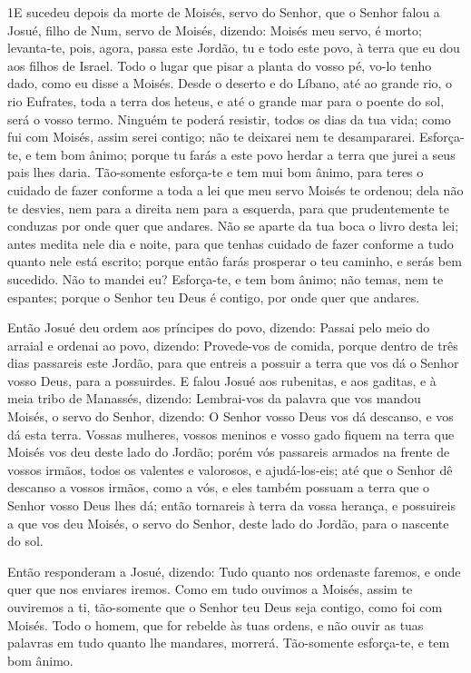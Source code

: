 
\lettrine{1} E sucedeu depois da morte de Moisés, servo do
Senhor, que o Senhor falou a Josué, filho de Num, servo de Moisés,
dizendo: Moisés meu servo, é morto; levanta-te, pois, agora,
passa este Jordão, tu e todo este povo, à terra que eu dou aos
filhos de Israel. Todo o lugar que pisar a planta do vosso pé,
vo-lo tenho dado, como eu disse a Moisés. Desde o deserto e do
Líbano, até ao grande rio, o rio Eufrates, toda a terra dos heteus,
e até o grande mar para o poente do sol, será o vosso termo.
Ninguém te poderá resistir, todos os dias da tua vida; como fui
com Moisés, assim serei contigo; não te deixarei nem te
desampararei. Esforça-te, e tem bom ânimo; porque tu farás a
este povo herdar a terra que jurei a seus pais lhes daria.
Tão-somente esforça-te e tem mui bom ânimo, para teres o cuidado
de fazer conforme a toda a lei que meu servo Moisés te ordenou; dela
não te desvies, nem para a direita nem para a esquerda, para que
prudentemente te conduzas por onde quer que andares. Não se
aparte da tua boca o livro desta lei; antes medita nele dia e noite,
para que tenhas cuidado de fazer conforme a tudo quanto nele está
escrito; porque então farás prosperar o teu caminho, e serás bem
sucedido. Não to mandei eu? Esforça-te, e tem bom ânimo; não
temas, nem te espantes; porque o Senhor teu Deus é contigo, por onde
quer que andares.

Então Josué deu ordem aos príncipes do povo, dizendo:
Passai pelo meio do arraial e ordenai ao povo, dizendo:
Provede-vos de comida, porque dentro de três dias passareis este
Jordão, para que entreis a possuir a terra que vos dá o Senhor vosso
Deus, para a possuirdes. E falou Josué aos rubenitas, e aos
gaditas, e à meia tribo de Manassés, dizendo: Lembrai-vos da
palavra que vos mandou Moisés, o servo do Senhor, dizendo: O Senhor
vosso Deus vos dá descanso, e vos dá esta terra. Vossas
mulheres, vossos meninos e vosso gado fiquem na terra que Moisés vos
deu deste lado do Jordão; porém vós passareis armados na frente de
vossos irmãos, todos os valentes e valorosos, e ajudá-los-eis;
até que o Senhor dê descanso a vossos irmãos, como a vós, e
eles também possuam a terra que o Senhor vosso Deus lhes dá; então
tornareis à terra da vossa herança, e possuireis a que vos deu
Moisés, o servo do Senhor, deste lado do Jordão, para o nascente do
sol.

Então responderam a Josué, dizendo: Tudo quanto nos ordenaste
faremos, e onde quer que nos enviares iremos. Como em tudo
ouvimos a Moisés, assim te ouviremos a ti, tão-somente que o Senhor
teu Deus seja contigo, como foi com Moisés. Todo o homem, que
for rebelde às tuas ordens, e não ouvir as tuas palavras em tudo
quanto lhe mandares, morrerá. Tão-somente esforça-te, e tem bom
ânimo.

